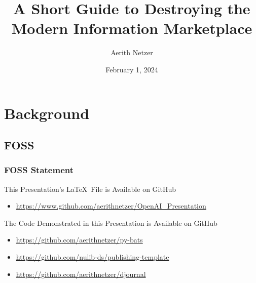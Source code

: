 \documentclass[aspectratio=169,9pt,xcolor=dvipsnames]{beamer}
\title[Intro]{A Short Guide to Destroying the Modern Information Marketplace} %
\author[Aerith Netzer]{Aerith Netzer} %
\institute[NU] %
{
Digital Publishing and Repository Librarian \\ %
\medskip
Northwestern University Libraries \\ %
\medskip
\textit{aerith.netzer@northwestern.edu} %
}
\date{February 1, 2024} %
\begin{document}
\begin{frame}
\titlepage %
\end{frame}


\section{Background}
\subsection{FOSS}
\begin{frame}
    \frametitle{FOSS Statement}
    \begin{block}{This Presentation's \LaTeX\ File is Available on GitHub}
        \begin{itemize}
            \item \url{https://www.github.com/aerithnetzer/OpenAI_Presentation}
        \end{itemize}
    \end{block}
    \begin{block}{The Code Demonstrated in this Presentation is Available on GitHub}
        \begin{itemize}
            \item \url{https://github.com/aerithnetzer/py-bats}
            \item \url{https://github.com/nulib-ds/publishing-template}
            \item \url{https://github.com/aerithnetzer/djournal}
        \end{itemize}
    \end{block}
\end{frame}
\end{document}
